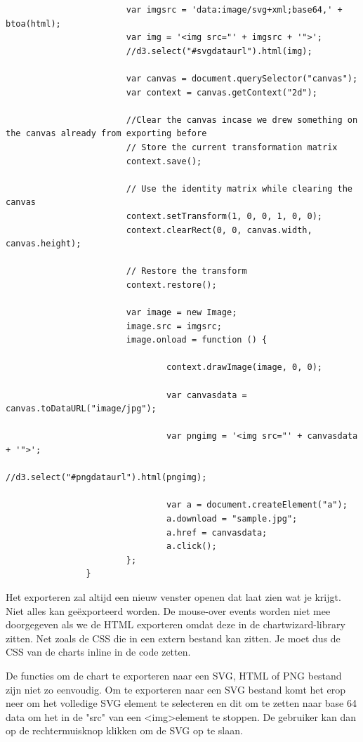 \begin{lstlisting}
                        var imgsrc = 'data:image/svg+xml;base64,' + btoa(html);
                        var img = '<img src="' + imgsrc + '">';
                        //d3.select("#svgdataurl").html(img);

                        var canvas = document.querySelector("canvas");
                        var context = canvas.getContext("2d");

                        //Clear the canvas incase we drew something on the canvas already from exporting before
                        // Store the current transformation matrix
                        context.save();

                        // Use the identity matrix while clearing the canvas
                        context.setTransform(1, 0, 0, 1, 0, 0);
                        context.clearRect(0, 0, canvas.width, canvas.height);

                        // Restore the transform
                        context.restore();

                        var image = new Image;
                        image.src = imgsrc;
                        image.onload = function () {

                                context.drawImage(image, 0, 0);

                                var canvasdata = canvas.toDataURL("image/jpg");

                                var pngimg = '<img src="' + canvasdata + '">';
                                //d3.select("#pngdataurl").html(pngimg);

                                var a = document.createElement("a");
                                a.download = "sample.jpg";
                                a.href = canvasdata;
                                a.click();
                        };
                }
\end{lstlisting}

Het exporteren zal altijd een nieuw venster openen dat laat zien wat je krijgt. Niet alles kan ge\"{e}xporteerd worden. De mouse-over events worden niet mee doorgegeven als we de HTML exporteren omdat deze in de chartwizard-library zitten. Net zoals de CSS die in een extern bestand kan zitten. Je moet dus de CSS van de charts inline in de code zetten.
 
De functies om de chart te exporteren naar een SVG, HTML of PNG bestand zijn niet zo eenvoudig.
Om te exporteren naar een SVG bestand komt het erop neer om het volledige SVG element te selecteren en dit om te zetten naar base 64 data om het in de "src" van een \textless img\textgreater element te stoppen. De gebruiker kan dan op de rechtermuisknop klikken om de SVG op te slaan.

